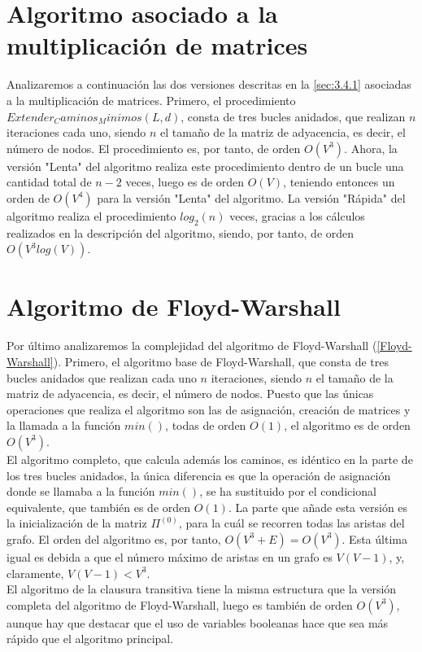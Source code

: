 \section{Algoritmo asociado a la multiplicación de matrices}

Analizaremos a continuación las dos versiones descritas en la \autoref{sec:3.4.1} asociadas a la multiplicación de matrices. Primero, el procedimiento $Extender_Caminos_Minimos(L,d)$, consta de tres bucles anidados, que realizan $n$ iteraciones cada uno, siendo $n$ el tamaño de la matriz de adyacencia, es decir, el número de nodos. El procedimiento es, por tanto, de orden $O(V^3)$. Ahora, la versión "Lenta" del algoritmo realiza este procedimiento dentro de un bucle una cantidad total de $n-2$ veces, luego es de orden $O(V)$, teniendo entonces un orden de $O(V^4)$ para la versión "Lenta" del algoritmo. La versión "Rápida" del algoritmo realiza el procedimiento $log_2(n)$ veces, gracias a los cálculos realizados en la descripción del algoritmo, siendo, por tanto, de orden $O(V^3log(V))$.

\section{Algoritmo de Floyd-Warshall}

Por último analizaremos la complejidad del algoritmo de Floyd-Warshall (\autoref{Floyd-Warshall}). Primero, el algoritmo base de Floyd-Warshall, que consta de tres bucles anidados que realizan cada uno $n$ iteraciones, siendo $n$ el tamaño de la matriz de adyacencia, es decir, el número de nodos. Puesto que las únicas operaciones que realiza el algoritmo son las de asignación, creación de matrices y la llamada a la función $min()$, todas de orden $O(1)$, el algoritmo es de orden $O(V^3)$. \\

El algoritmo completo, que calcula además los caminos, es idéntico en la parte de los tres bucles anidados, la única diferencia es que la operación de asignación donde se llamaba a la función $min()$, se ha sustituido por el condicional equivalente, que también es de orden $O(1)$. La parte que añade esta versión es la inicialización de la matriz $\Pi^(0)$, para la cuál se recorren todas las aristas del grafo. El orden del algoritmo es, por tanto, $O(V^3 + E) = O(V^3)$. Esta última igual es debida a que el número máximo de aristas en un grafo es $V(V-1)$, y, claramente, $V(V-1)<V^3$. \\

El algoritmo de la clausura transitiva tiene la misma estructura que la versión completa del algoritmo de Floyd-Warshall, luego es también de orden $O(V^3)$, aunque hay que destacar que el uso de variables booleanas hace que sea más rápido que el algoritmo principal.

\endinput



